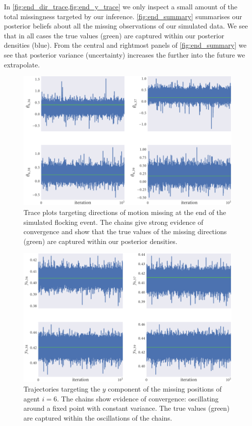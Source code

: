 In \cref{fig:end_dir_trace,fig:end_y_trace} we only inspect a small amount of
the total missingness targeted by our inference. \cref{fig:end_summary}
summarises our posterior beliefs about all the missing observations of our
simulated data. We see that in all cases the true values (green) are captured
within our posterior densities (blue). From the central and rightmost panels of
\cref{fig:end_summary} we see that posterior variance (uncertainty) increases
the further into the future we extrapolate.


\begin{figure}[tbp]
  \includegraphics{end/dir_trace.pdf}
  \caption{Trace plots targeting directions of motion missing at the end of the
  simulated flocking event. The chains give strong evidence of convergence and
  show that the true values of the missing directions (green) are captured within
  our posterior densities.}
  \label{fig:end_dir_trace}
\end{figure}
\begin{figure}[tbp]
  \includegraphics{end/y_trace.pdf}
  \caption{Trajectories targeting the $y$ component of the missing positions of
    agent $i=6$. The chains show evidence of convergence: oscillating around
    a fixed point with constant variance. The true values (green) are
    captured within the oscillations of the chains.}
  \label{fig:end_y_trace}
\end{figure}
